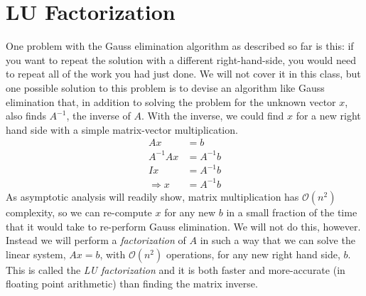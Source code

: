 \setcounter{lstannotation}{0} %
\section{LU Factorization}
One problem with the Gauss elimination algorithm as described so far is this:  if you want to repeat the solution with a different right-hand-side, you would need to repeat all of the work you had just done.  We will not cover it in this class, but one possible solution to this problem is to devise an algorithm like Gauss elimination that, in addition to solving the problem for the unknown vector $x$, also finds $A^{-1}$, the inverse of $A$.  With the inverse, we could find $x$ for a new right hand side with a simple matrix-vector multiplication.
\begin{align*}
Ax &= b \\
A^{-1}Ax &= A^{-1}b \\
Ix &= A^{-1}b \\
\Rightarrow x &= A^{-1}b
\end{align*}
As asymptotic analysis will readily show, matrix multiplication has $\mathcal{O}(n^2)$ complexity, so we can re-compute $x$ for any new $b$ in a small fraction of the time that it would take to re-perform Gauss elimination.  
We will not do this, however.  Instead we will perform a \emph{factorization} of $A$ in such a way that we can solve the linear system, $Ax=b$, with $\mathcal{O}(n^2)$ operations, for any new right hand side, $b$. This is called the \emph{LU factorization} and it is both faster and more-accurate (in floating point arithmetic) than finding the matrix inverse.\cite{higham-matrix-inverse} 

